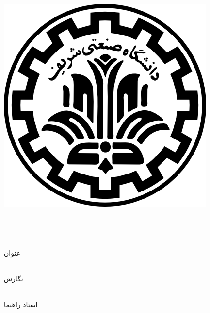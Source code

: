 
\pagestyle{empty}

\begin{center}

\includegraphics[scale=0.2]{front/template/images/logo.png}

\begin{Large}

\vspace{-0.2cm}
\ThesisUniversity \\[-0.3em]
\ThesisDepartment

\vspace{0.5cm}

\ThesisType \\[-0.3em]
\ThesisMajor

\end{Large}

\vspace{1cm}

\large{عنوان}\\[-.5em]
\huge{\textbf{\ThesisTitle}}\\

\vspace{1cm}

\large{نگارش}\\
\Large{\textbf{\ThesisAuthor}}\\

\vspace{0.7cm}

\large{استاد راهنما}\\ 
\Large{\textbf{\ThesisSupervisor}}\\

\vspace{0.8cm}

\large{\ThesisDate}

\end{center}

\newpage
